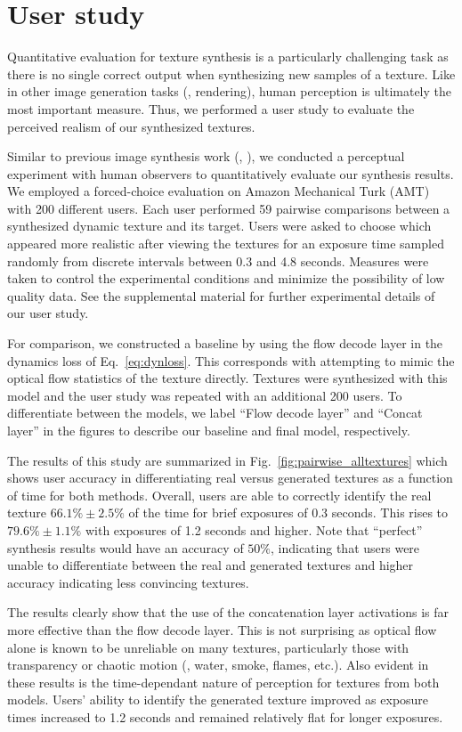 \section{User study}
Quantitative evaluation for texture synthesis is a particularly
challenging task as there is no single correct output when 
synthesizing new samples of a texture.
Like in other image generation tasks (\eg, rendering), 
human perception is ultimately the most important measure.
Thus, we performed a user study to evaluate the perceived 
realism of our synthesized textures.

Similar to previous image synthesis work (\eg, \cite{chen2017}), 
we conducted a perceptual experiment with human observers to 
quantitatively evaluate our synthesis results.
We employed a forced-choice evaluation on Amazon Mechanical
Turk (AMT) with 200 different users. Each user performed 59
pairwise comparisons between a synthesized dynamic texture and 
its target.
Users were asked to choose which appeared more realistic
after viewing the textures for an exposure time sampled
randomly from discrete intervals between 0.3 and 4.8 seconds.
Measures were taken to control the experimental conditions and
minimize the possibility of low quality data.
See the supplemental material for further experimental details
of our user study.

For comparison, we constructed a baseline by using the 
flow decode layer in the dynamics loss of Eq.\ \ref{eq:dynloss}.
This corresponds with attempting to mimic the optical flow 
statistics of the texture directly.
Textures were synthesized with this model and the user study
was repeated with an additional 200 users.
To differentiate between the models, we label ``Flow decode layer'' 
and ``Concat layer'' in the figures to describe our baseline and 
final model, respectively.

The results of this study are summarized in
Fig.\ \ref{fig:pairwise_alltextures} which shows user accuracy in
differentiating real versus generated textures as a function of
time for both methods.
Overall, users are able to correctly identify the real texture
$66.1\% \pm 2.5\%$ of the time for brief 
exposures of 0.3 seconds.
This rises to $79.6\% \pm 1.1\%$ with exposures of 1.2 seconds 
and higher.
Note that ``perfect'' synthesis results would have an accuracy
of $50\%$, indicating that users were unable to differentiate 
between the real and generated textures and higher accuracy 
indicating less convincing textures.

The results clearly show that the use of the concatenation 
layer activations is far more effective than the flow decode 
layer.
This is not surprising as optical flow alone is known to be 
unreliable on many textures, particularly those with
transparency or chaotic motion (\eg, water, smoke, flames, etc.).
Also evident in these results is the time-dependant nature of 
perception for textures from both models.
Users' ability to identify the generated texture improved as 
exposure times increased to 1.2 seconds and remained relatively 
flat for longer exposures.

